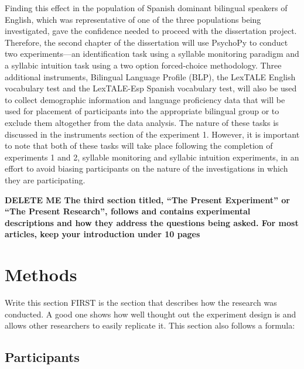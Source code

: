 Finding this effect in the population of Spanish dominant bilingual speakers of English, which was representative of one of the three populations being investigated, gave the confidence needed to proceed with the dissertation project. Therefore, the second chapter of the dissertation will use PsychoPy to conduct two experiments—an identification task using a syllable monitoring paradigm and a syllabic intuition task using a two option forced-choice methodology. Three additional instruments, Bilingual Language Profile (BLP), the LexTALE English vocabulary test and the LexTALE-Esp Spanish vocabulary test, will also be used to collect demographic information and language proficiency data that will be used for placement of participants into the appropriate bilingual group or to exclude them altogether from the data analysis. The nature of these tasks is discussed in the instruments section of the experiment 1. However, it is important to note that both of these tasks will take place following the completion of experiments 1 and 2, syllable monitoring and syllabic intuition experiments, in an effort to avoid biasing participants on the nature of the investigations in which they are participating.


\textbf{DELETE ME The third section titled, “The Present Experiment” or “The Present Research”, follows and contains experimental descriptions and how they address the questions being asked.
For most articles, keep your introduction under 10 pages}


\section{Methods}

Write this section FIRST
is the section that describes how the research was conducted. A good one shows how well thought out the experiment design is and allows other researchers to easily replicate it. This section also follows a formula:

\subsection{Participants}

